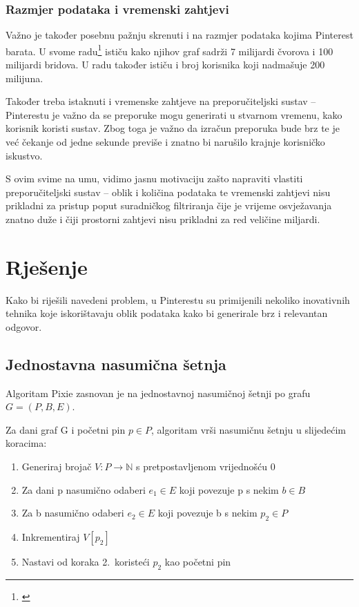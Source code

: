 \documentclass[times, utf8, seminar]{fer}
\begin{document}
\subsection{Razmjer podataka i vremenski zahtjevi}

Važno je također posebnu pažnju skrenuti i na razmjer podataka kojima Pinterest barata. U svome radu\footnote{\cite{DBLP:journals/corr/abs-1711-07601}} ističu kako njihov graf sadrži 7 milijardi čvorova i 100 milijardi bridova. U radu također ističu i broj korisnika koji nadmašuje 200 milijuna.

Također treba istaknuti i vremenske zahtjeve na preporučiteljski sustav -- Pinterestu je važno da se preporuke mogu generirati u stvarnom vremenu, kako korisnik koristi sustav. Zbog toga je važno da izračun preporuka bude brz te je već čekanje od jedne sekunde previše i znatno bi narušilo krajnje korisničko iskustvo.

S ovim svime na umu, vidimo jasnu motivaciju zašto napraviti vlastiti preporučiteljski sustav -- oblik i količina podataka te vremenski zahtjevi nisu prikladni za pristup poput suradničkog filtriranja čije je vrijeme osvježavanja znatno duže i čiji prostorni zahtjevi nisu prikladni za red veličine miljardi.

\chapter{Rješenje}

Kako bi riješili navedeni problem, u Pinterestu su primijenili nekoliko inovativnih tehnika koje iskorištavaju oblik podataka kako bi generirale brz i relevantan odgovor.

\section{Jednostavna nasumična šetnja}

Algoritam Pixie zasnovan je na jednostavnoj nasumičnoj šetnji po grafu $G = (P, B, E) $.

Za dani graf G i početni pin $p \in P$, algoritam vrši nasumičnu šetnju u slijedećim koracima:

\begin{enumerate}
	\item Generiraj brojač $V: P \to \mathbb{N}$ s pretpostavljenom vrijednošću 0
	\item Za dani p nasumično odaberi $e_1 \in E$ koji povezuje p s nekim $b \in B$
	\item Za b nasumično odaberi $e_2 \in E$ koji povezuje b s nekim $p_2 \in P$
	\item Inkrementiraj $V[p_2]$
	\item Nastavi od koraka 2.\ koristeći $p_2$ kao početni pin
\end{enumerate}
\end{document}
